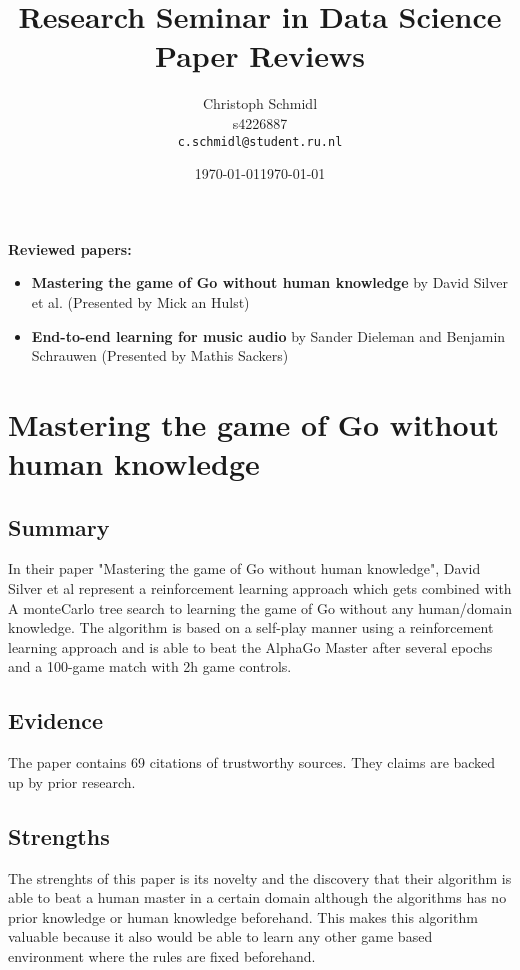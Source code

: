 \documentclass[a4paper]{article}
\title{Research Seminar in Data Science\\Paper Reviews}
\author{
  Christoph Schmidl\\ s4226887\\      \texttt{c.schmidl@student.ru.nl}
}
\date{\today}
\date{\today}
\begin{document}
\maketitle

\textbf{Reviewed papers:}

\begin{itemize}
	\item \textbf{Mastering the game of Go without human knowledge} by David Silver et al. (Presented by Mick an Hulst)
	\item \textbf{End-to-end learning for music audio} by Sander Dieleman and Benjamin Schrauwen (Presented by Mathis Sackers)
\end{itemize}


\section{Mastering the game of Go without human knowledge}

\subsection{Summary}

In their paper "Mastering the game of Go without human knowledge", David Silver et al represent a reinforcement learning approach which gets combined with A monteCarlo tree search to learning the game of Go without any human/domain knowledge. The algorithm is based on a self-play manner using a reinforcement learning approach and is able to beat the AlphaGo Master after several epochs and a 100-game match with 2h game controls.

\subsection{Evidence}

The paper contains 69 citations of trustworthy sources. They claims are backed up by prior research.

\subsection{Strengths}

The strenghts of this paper is its novelty and the discovery that their algorithm is able to beat a human master in a certain domain although the algorithms has no prior knowledge or human knowledge beforehand. This makes this algorithm valuable because it also would be able to learn any other game based environment where the rules are fixed beforehand.
\end{document}
